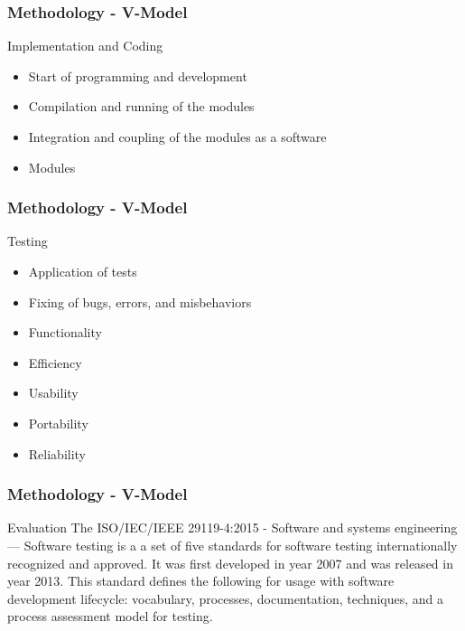 \documentclass[handout]{beamer}
\begin{document}
\begin{frame}
	\frametitle{Methodology - V-Model}
	\begin{block}{Implementation and Coding}
		\begin{itemize}
			\item<1-> Start of programming and development
			\item<2-> Compilation and running of the modules
			\item<3-> Integration and coupling of the modules as a software
		\end{itemize}

		\begin{itemize}
			\item<4-> Modules
		\end{itemize}
	\end{block}
\end{frame}

\begin{frame}
	\frametitle{Methodology - V-Model}
	\begin{block}{Testing}
		\begin{itemize}
			\item<1-> Application of tests
			\item<2-> Fixing of bugs, errors, and misbehaviors
		\end{itemize}

		\begin{itemize}
			\item<3-> Functionality
			\item<4-> Efficiency
			\item<5-> Usability
			\item<6-> Portability
			\item<7-> Reliability
		\end{itemize}
	\end{block}
\end{frame}

\begin{frame}
	\frametitle{Methodology - V-Model}
	\begin{block}{Evaluation}
		The ISO/IEC/IEEE 29119-4:2015 - Software and systems engineering — Software
		testing is a a set of five standards for software testing internationally
		recognized and approved. It was first developed in year 2007 and was
		released in year 2013. This standard defines the following for usage with
		software development lifecycle: vocabulary, processes, documentation,
		techniques, and a process assessment model for testing.
	\end{block}
\end{frame}
\end{document}
